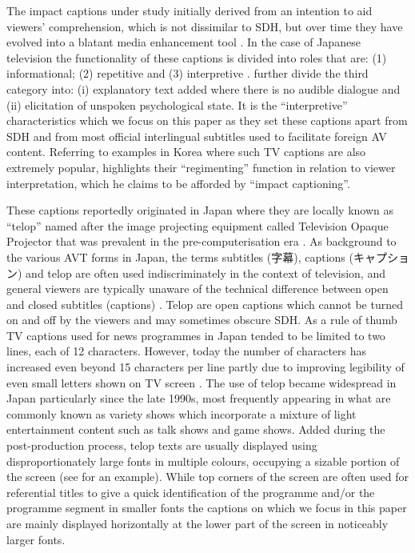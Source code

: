 \documentclass[output=paper]{langsci/langscibook}
\begin{document}
The impact captions under study initially derived from an intention to aid viewers' comprehension, which is not dissimilar to SDH, but over time they have evolved into a blatant media enhancement tool \citep[48--50]{Kato2012}.  In the case of Japanese television the functionality of these captions is divided into roles that are: (1) informational; (2) repetitive and (3) interpretive \citep[72]{Shiota2003}. \citet{Kimura2000} further divide the third category into: (i) explanatory text added where there is no audible dialogue and (ii) elicitation of unspoken psychological state. It is the ``interpretive'' characteristics which we focus on this paper as they set these captions apart from SDH and from most official interlingual subtitles used to facilitate foreign AV content. Referring to examples in Korea where such TV captions are also extremely popular, \citet{Park2009} highlights their ``regimenting'' function in relation to viewer interpretation, which he claims to be afforded by ``impact captioning''. 

These captions reportedly originated in Japan where they are locally known as ``telop'' named after the image projecting equipment called Television Opaque Projector that was prevalent in the pre-computerisation era \citep{Sakamoto1999}. As background to the various AVT forms in Japan, the terms subtitles 
({字幕}),
captions 
({キャプション}) 
and telop are often used indiscriminately in the context of television, and general viewers are typically unaware of the technical difference between open and closed subtitles (captions) \citep[73--74]{ohagan2010}. Telop are open captions which cannot be turned on and off by the viewers and may sometimes obscure SDH.  As a rule of thumb TV captions used for news programmes in Japan tended to be limited to two lines, each of 12 characters. However, today the number of characters has increased even beyond 15 characters per line partly due to improving legibility of even small letters shown on TV screen \citep[47--48]{Kato2012}. The use of telop became widespread in Japan particularly since the late 1990s, most frequently appearing in what are commonly known as variety shows \citep{Shitara2012} which incorporate a mixture of light entertainment content such as talk shows and game shows. Added during the post-production process, telop texts are usually displayed using disproportionately large fonts in multiple colours, occupying a sizable portion of the screen (see  for an example).  While top corners of the screen are often used for referential titles to give a quick identification of the programme and/or the programme segment in smaller fonts the captions on which we focus in this paper are mainly displayed horizontally at the lower part of the screen in noticeably larger fonts. 
\end{document}
